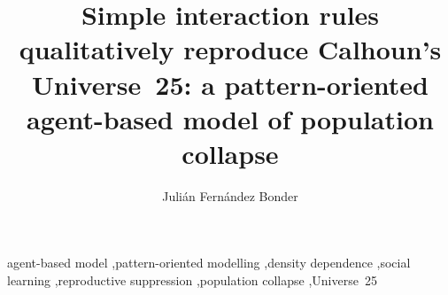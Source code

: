 \documentclass[preprint,12pt,authoryear]{elsarticle}
\begin{document}
\begin{frontmatter}

\title{Simple interaction rules qualitatively reproduce Calhoun's Universe~25: a pattern-oriented agent-based model
of population collapse}

\author{Juli\'an Fern\'andez Bonder}



\begin{keyword}
agent-based model \sep pattern-oriented modelling \sep density dependence \sep social learning \sep reproductive
suppression \sep population collapse \sep Universe~25
\end{keyword}

\end{frontmatter}

\linenumbers










\end{document}
